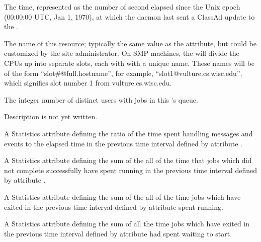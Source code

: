 \begin{description}
\item[\AdAttr{MyCurrentTime}:]  The time, represented as the number of 
  second elapsed since the Unix epoch (00:00:00 UTC, Jan 1, 1970),
  at which the  daemon last sent a ClassAd update to the
  .

\item[\AdAttr{Name}:] The name of this resource; typically the same value as
  the  attribute, but could be customized by the site
  administrator.
  On SMP machines, the  will divide the CPUs up into separate
  slots, each with with a unique name.
  These names will be of the form ``slot\#@full.hostname'', for example,
  ``slot1@vulture.cs.wisc.edu'', which signifies slot number 1 from
  vulture.cs.wisc.edu.

\item[\AdAttr{NumUsers}:] The integer number of distinct users with jobs in
  this 's queue.

\item[\AdAttr{PublicNetworkIpAddr}:] Description is not yet written.

\item[\AdAttr{RecentDaemonCoreDutyCycle}:] A Statistics attribute defining
  the ratio of the time spent 
  handling messages and events to the elapsed time 
  in the previous time interval defined by attribute .

\item[\AdAttr{RecentJobsAccumBadputTime}:] A Statistics attribute defining
  the sum of the all of the time that jobs which did not complete successfully 
  have spent running 
  in the previous time interval defined by attribute .


\item[\AdAttr{RecentJobsAccumRunningTime}:] A Statistics attribute defining
  the sum of the all of the time jobs 
  which have exited 
  in the previous time interval defined by attribute 
  spent running.

\item[\AdAttr{RecentJobsAccumTimeToStart}:] A Statistics attribute defining
  the sum of all the time jobs 
  which have exited
  in the previous time interval defined by attribute 
  had spent waiting to start.


\end{description}

